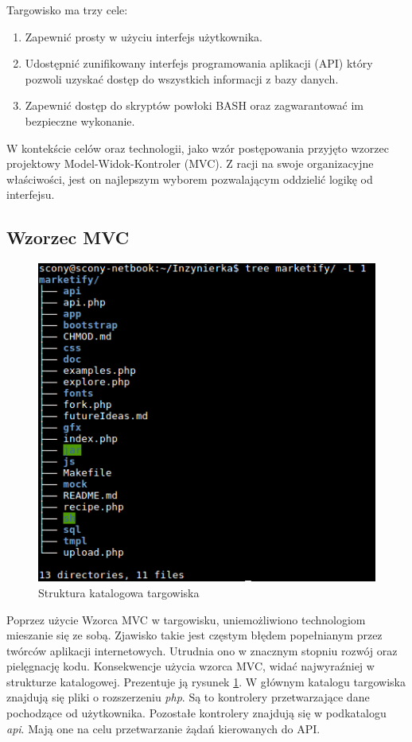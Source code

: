 \documentclass[11pt,a4paper,polish,thesis]{dcsbook}
\begin{document}
Targowisko ma trzy cele:
\begin{enumerate}
\item Zapewnić prosty w użyciu interfejs użytkownika.
\item Udostępnić zunifikowany interfejs programowania aplikacji (API) który pozwoli uzyskać dostęp do wszystkich informacji z bazy danych.
\item Zapewnić dostęp do skryptów powłoki BASH oraz zagwarantować im bezpieczne wykonanie.
\end{enumerate}

W kontekście celów oraz technologii, jako wzór postępowania przyjęto wzorzec projektowy Model-Widok-Kontroler (MVC). Z racji na swoje organizacyjne właściwości, jest
on najlepszym wyborem pozwalającym oddzielić logikę od interfejsu.
\subsection{Wzorzec MVC}
\begin{figure}[H]
  \centering
  \includegraphics[scale=0.7]{./resources/market_tree.png}
  \caption{Struktura katalogowa targowiska}
  \label{fig:market_tree}
\end{figure}
Poprzez użycie Wzorca MVC w targowisku, uniemożliwiono technologiom mieszanie się ze sobą. Zjawisko takie jest częstym błędem popełnianym przez twórców aplikacji
internetowych. Utrudnia ono w znacznym stopniu rozwój oraz pielęgnację kodu. Konsekwencje użycia wzorca MVC, widać najwyraźniej w strukturze katalogowej.
Prezentuje ją rysunek \ref{fig:market_tree}.
W głównym katalogu targowiska znajdują się pliki o rozszerzeniu \emph{php}. Są to kontrolery przetwarzające dane pochodzące od użytkownika. Pozostałe kontrolery
znajdują się w podkatalogu \emph{api}. Mają one na celu przetwarzanie żądań kierowanych do API.
\end{document}
